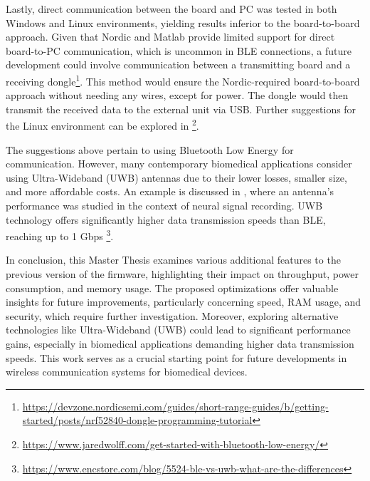 \documentclass{Configuration_Files/PoliMi3i_thesis}
\begin{document}
Lastly, direct communication between the board and PC was tested in both Windows and Linux environments, yielding results inferior to the board-to-board approach. Given that Nordic and Matlab provide limited support for direct board-to-PC communication, which is uncommon in BLE connections, a future development could involve communication between a transmitting board and a receiving dongle\footnote{\url{https://devzone.nordicsemi.com/guides/short-range-guides/b/getting-started/posts/nrf52840-dongle-programming-tutorial}}. This method would ensure the Nordic-required board-to-board approach without needing any wires, except for power. The dongle would then transmit the received data to the external unit via USB. Further suggestions for the Linux environment can be explored in \footnote{\url{https://www.jaredwolff.com/get-started-with-bluetooth-low-energy/}}.

The suggestions above pertain to using Bluetooth Low Energy for communication. However, many contemporary biomedical applications consider using Ultra-Wideband (UWB) antennas due to their lower losses, smaller size, and more affordable costs. An example is discussed in \cite{patwary2020modeling}, where an antenna's performance was studied in the context of neural signal recording. UWB technology offers significantly higher data transmission speeds than BLE, reaching up to 1 Gbps \footnote{\url{https://www.encstore.com/blog/5524-ble-vs-uwb-what-are-the-differences}}.

In conclusion, this Master Thesis examines various additional features to the previous version of the firmware, highlighting their impact on throughput, power consumption, and memory usage. The proposed optimizations offer valuable insights for future improvements, particularly concerning speed, RAM usage, and security, which require further investigation. Moreover, exploring alternative technologies like Ultra-Wideband (UWB) could lead to significant performance gains, especially in biomedical applications demanding higher data transmission speeds. This work serves as a crucial starting point for future developments in wireless communication systems for biomedical devices.
\end{document}
